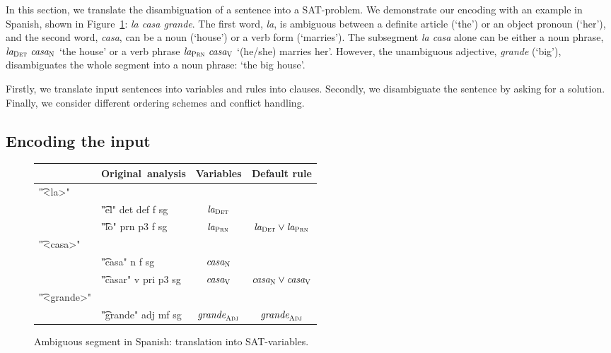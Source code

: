 In this section, we translate the disambiguation of a sentence into a SAT-problem.
We demonstrate our encoding with an example in Spanish, shown in Figure~\ref{fig:laCasaGrande}: {\em la casa grande}. %
The first word, {\em la}, is ambiguous between a definite article (`the') or an object pronoun (`her'), and the second word, {\em casa}, can be a noun (`house') or a verb form (`marries').
The subsegment {\em la casa} alone can be either a noun phrase, $\text{\em la}_{\text{\sc Det}} \ \text{\em casa}_{\text{\sc N}}$ 
`the house'  or a verb phrase $\text{\em la}_{\text{\sc Prn}} \ \text{\em casa}_{\text{\sc V}}$   `(he/she) marries her'. 
However, the unambiguous adjective, {\em grande} (`big'), disambiguates the whole segment into a noun phrase: `the big house'.

Firstly, we translate input sentences into variables and rules into clauses.
Secondly, we disambiguate the sentence by asking for a solution. 
Finally, we consider different ordering schemes and conflict handling.


\subsection{Encoding the input}


\begin{figure}[h]
\centering
\begin{tabular}{p{0.6cm} l | c | c }
   & \textbf{Original~analysis} 
                & \textbf{Variables}
                              & \textbf{Default rule} \\ \hline
\t{"<la>"}   &   &            &  {\small {}} \\
  & \t{"el" 
  det def f sg}  & $\text{\em la}_{\text{\sc Det}}$   &  \\
  & \t{"lo" 
  prn p3 f sg}   & $\text{\em la}_{\text{\sc Prn}}$   &   $\text{\em la}_{\text{\sc Det}} \vee \text{\em la}_{\text{\sc Prn}}$ \\
\t{"<casa>"} &   &            &   \\
  & \t{"casa" 
  n f sg}        & $\text{\em casa}_{\text{\sc N}}$   &  \\
  & \t{"casar"
   v pri p3 sg}  & $\text{\em casa}_{\text{\sc V}}$   & $\text{\em casa}_{\text{\sc N}} \vee \text{\em casa}_{\text{\sc V}}$  \\
\t{"<grande>"} & &            & \\
  & \t{"grande" 
  adj mf sg}   & $\text{\em grande}_{\text{\sc Adj}}$ & $\text{\em grande}_{\text{\sc Adj}}$
\end{tabular}
\caption{Ambiguous segment in Spanish: translation into SAT-variables.}
\label{fig:laCasaGrande}
\end{figure}



